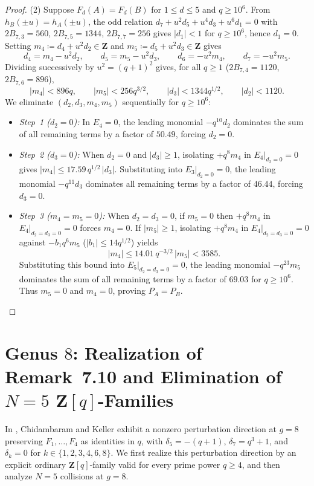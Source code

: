 \documentclass[11pt]{amsart}
\theoremstyle{remark}
\newcommand{\Z}{\mathbf{Z}}
\begin{document}
\begin{proof}
(2) Suppose $F_d(A) = F_d(B)$ for $1 \le d \le 5$ and $q \ge 10^6$. From $h_B(\pm u) = h_A(\pm u)$, the odd relation $d_7 + u^2 d_5 + u^4 d_3 + u^6 d_1 = 0$ with $2 B_{7,3} = 560$, $2 B_{7,5} = 1344$, $2 B_{7,7} = 256$ gives $|d_1| < 1$ for $q \ge 10^6$, hence $d_1 = 0$. Setting $m_4 \coloneqq d_4 + u^2 d_2 \in \Z$ and $m_5 \coloneqq d_5 + u^2 d_3 \in \Z$ gives
\[
d_4 = m_4 - u^2 d_2, \qquad d_5 = m_5 - u^2 d_3, \qquad d_6 = -u^2 m_4, \qquad d_7 = -u^2 m_5.
\]
Dividing successively by $u^2 = (q + 1)^2$ gives, for all $q \ge 1$ ($2 B_{7,4} = 1120$, $2 B_{7,6} = 896$),
\[
|m_4| < 896 q, \qquad |m_5| < 256 q^{3/2}, \qquad |d_3| < 1344 q^{1/2}, \qquad |d_2| < 1120.
\]
We eliminate $(d_2, d_3, m_4, m_5)$ sequentially for $q \ge 10^6$:
\begin{itemize}
\item \emph{Step~1 ($d_2 = 0$):} In $E_4 = 0$, the leading monomial $-q^{10} d_2$ dominates the sum of all remaining terms by a factor of $50.49$, forcing $d_2 = 0$.
\item \emph{Step~2 ($d_3 = 0$):} When $d_2 = 0$ and $|d_3| \ge 1$, isolating $+q^8 m_4$ in $E_4|_{d_2 = 0} = 0$ gives $|m_4| \le 17.59\, q^{1/2}\, |d_3|$. Substituting into $E_3|_{d_2 = 0} = 0$, the leading monomial $-q^{11} d_3$ dominates all remaining terms by a factor of $46.44$, forcing $d_3 = 0$.
\item \emph{Step~3 ($m_4 = m_5 = 0$):} When $d_2 = d_3 = 0$, if $m_5 = 0$ then $+q^8 m_4$ in $E_4|_{d_2 = d_3 = 0} = 0$ forces $m_4 = 0$. If $|m_5| \ge 1$, isolating $+q^8 m_4$ in $E_4|_{d_2 = d_3 = 0} = 0$ against $-b_1 q^6 m_5$ ($|b_1| \le 14 q^{1/2}$) yields
\[
|m_4| \le 14.01\, q^{-3/2}\, |m_5| < 3585.
\]
Substituting this bound into $E_5|_{d_2 = d_3 = 0} = 0$, the leading monomial $-q^{23} m_5$ dominates the sum of all remaining terms by a factor of $69.03$ for $q \ge 10^6$. Thus $m_5 = 0$ and $m_4 = 0$, proving $P_A = P_B$.\qedhere
\end{itemize}
\end{proof}

\section{Genus \texorpdfstring{$8$}{8}: Realization of Remark~7.10 and Elimination of \texorpdfstring{$N = 5$ $\Z[q]$}{N = 5 Z[q]}-Families}\label{sec:g8}

In \cite[Remark~7.10]{CK26}, Chidambaram and Keller exhibit a nonzero perturbation direction at $g = 8$ preserving $F_1, \dots, F_4$ as identities in $q$, with $\delta_5 = -(q + 1)$, $\delta_7 = q^3 + 1$, and $\delta_k = 0$ for $k \in \{1, 2, 3, 4, 6, 8\}$. We first realize this perturbation direction by an explicit ordinary $\Z[q]$-family valid for every prime power $q \ge 4$, and then analyze $N = 5$ collisions at $g = 8$.
\end{document}
